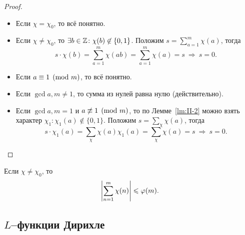 \begin{proof}
\hfill
    \begin{statesp}
        \item
        \hfill
            \begin{itemize}[label={}]
                \item 
                    Если $\chi = \chi_0$, то всё понятно.
                \item
                    Если $\chi \ne \chi_0$, то $\exists b \in \mathbb{Z}\colon \chi(b) \not\in \{ 0, 1 \}$. Положим $s = \sum_{a=1}^m \chi(a)$, тогда 
                    \[
                        s \cdot \chi(b) 
                        = \sum_{a=1}^m \chi(ab) 
                        = \sum_{a=1}^m \chi(a) 
                        = s \ \Rightarrow \ s = 0.
                    \]
            \end{itemize}
        \item
        \hfill
            \begin{itemize}[label={}]
                \item
                    Если $a \equiv 1 \pmod m$, то всё понятно.
                \item
                    Если $\gcd{a, m} \ne 1$, то сумма из нулей равна нулю (действительно).
                \item
                    Если $\gcd{a, m} = 1$ и $a \not\equiv 1 \pmod{m}$, то по Лемме~\ref{lm:II-2} можно взять характер $\chi_1\colon \chi_1(a) \not\in \{ 0, 1 \}$. Положим $s = \sum_\chi \chi(a)$, тогда 
                    \[
                        s \cdot \chi_1(a) 
                        = \sum_\chi \chi(a)\chi_1(a) 
                        = \sum_\chi \chi(a) 
                        = s \ \Rightarrow \ s = 0.
                    \]
            \end{itemize}
    \end{statesp}
\end{proof}

\begin{ncorollary}
\label{crl:II-1}
    Если $\chi \ne \chi_0$, то 
    \[
        \left| \sum_{n=1}^m \chi(n) \right| \leqslant \varphi(m).
    \]
\end{ncorollary}


\subsection{\texorpdfstring{$L$--функции Дирихле}{L--функции Дирихле}}
\label{subsec:1_Dirichlet-L-function}

